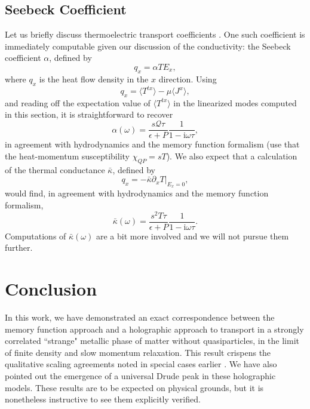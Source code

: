 \documentclass[10pt, oneside]{book}
\begin{document}
\begin{doublespace}
\subsection{Seebeck Coefficient}
Let us briefly discuss thermoelectric transport coefficients \cite{Amoretti:2014zha, Amoretti:2014mma, Donos:2014cya, Kim:2014bza, Davison:2014lua}.   One such coefficient is immediately computable given our discussion of the conductivity:  the Seebeck coefficient $\alpha$, defined by \begin{equation}
q_x = \alpha T E_x,
\end{equation}where $q_x$ is the heat flow density in the $x$ direction.   Using \begin{equation}
q_x = \langle T^{tx}\rangle - \mu \langle J^x\rangle,
\end{equation}and reading off the expectation value of $\langle T^{tx}\rangle$ in the linearized modes computed in this section, it is straightforward to recover \begin{equation}
\alpha(\omega) = \frac{s\mathcal{Q}\tau}{\epsilon+P} \frac{1}{1-\mathrm{i}\omega\tau}, 
\end{equation}in agreement with hydrodynamics \cite{hkms} and the memory function formalism (use that the heat-momentum susceptibility $\chi_{QP} = sT$).     We also expect that a calculation of the thermal conductance $\bar\kappa$, defined by \begin{equation}
q_x = \left. -\bar \kappa \partial_x T\right|_{E_x=0},
\end{equation}would find, in agreement with hydrodynamics and the memory function formalism, \begin{equation}
\bar\kappa(\omega) = \frac{s^2 T \tau}{\epsilon+P} \frac{1}{1-\mathrm{i}\omega\tau}.
\end{equation}Computations of $\bar\kappa(\omega)$ are a bit more involved \cite{Amoretti:2014zha, Amoretti:2014mma, Donos:2014cya, Kim:2014bza, Davison:2014lua} and we will not pursue them further.

\section{Conclusion}
In this work, we have demonstrated an exact correspondence between the memory function approach and a holographic approach to transport in a strongly correlated ``strange" metallic phase of matter without quasiparticles, in the limit of finite density and slow momentum relaxation.      This result crispens the qualitative scaling agreements noted in special cases earlier \cite{Blake:2013owa, lucas1401}.   We have also pointed out the emergence of a universal Drude peak in these holographic models.   These results are to be expected  on physical grounds, but it is nonetheless instructive to see them explicitly verified.


\end{doublespace}
\end{document}
